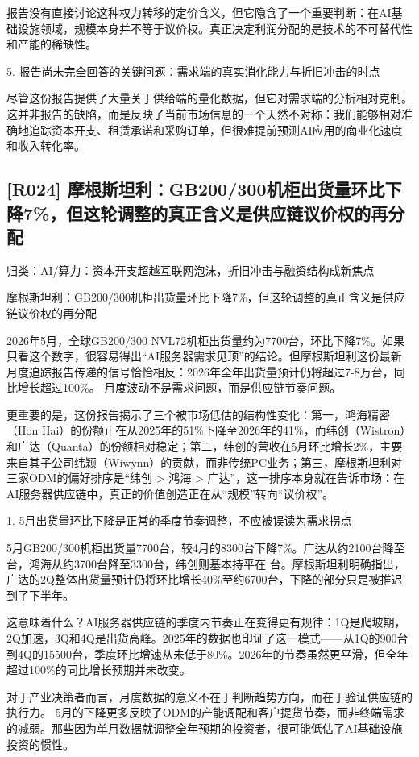 \documentclass[11pt]{ctexart}
\begin{document}
报告没有直接讨论这种权力转移的定价含义，但它隐含了一个重要判断：在AI基础设施领域，规模本身并不等于议价权。真正决定利润分配的是技术的不可替代性和产能的稀缺性。

5. 报告尚未完全回答的关键问题：需求端的真实消化能力与折旧冲击的时点

尽管这份报告提供了大量关于供给端的量化数据，但它对需求端的分析相对克制。这并非报告的缺陷，而是反映了当前市场信息的一个天然不对称：我们能够相对准确地追踪资本开支、租赁承诺和采购订单，但很难提前预测AI应用的商业化速度和收入转化率。

\subsection{[R024] 摩根斯坦利：GB200/300机柜出货量环比下降7\%，但这轮调整的真正含义是供应链议价权的再分配}
{\small\color{refgray}归类：AI/算力：资本开支超越互联网泡沫，折旧冲击与融资结构成新焦点}

摩根斯坦利：GB200/300机柜出货量环比下降7\%，但这轮调整的真正含义是供应链议价权的再分配

2026年5月，全球GB200/300 NVL72机柜出货量约为7700台，环比下降7\%。如果只看这个数字，很容易得出“AI服务器需求见顶”的结论。但摩根斯坦利这份最新月度追踪报告传递的信号恰恰相反：2026年全年出货量预计仍将超过7-8万台，同比增长超过100\%。 月度波动不是需求问题，而是供应链节奏问题。

更重要的是，这份报告揭示了三个被市场低估的结构性变化：第一，鸿海精密（Hon Hai）的份额正在从2025年的51\%下降至2026年的41\%，而纬创（Wistron）和广达（Quanta）的份额相对稳定；第二，纬创的营收在5月环比增长2\%，主要来自其子公司纬颖（Wiwynn）的贡献，而非传统PC业务；第三，摩根斯坦利对三家ODM的偏好排序是“纬创 > 鸿海 > 广达”，这一排序本身就在告诉市场：在AI服务器供应链中，真正的价值创造正在从“规模”转向“议价权”。

1. 5月出货量环比下降是正常的季度节奏调整，不应被误读为需求拐点

5月GB200/300机柜出货量7700台，较4月的8300台下降7\%。广达从约2100台降至 台，鸿海从约3700台降至3300台，纬创则基本持平在 台。摩根斯坦利明确指出，广达的2Q整体出货量预计仍将环比增长40\%至约6700台，下降的部分只是被推迟到了下半年。

这意味着什么？AI服务器供应链的季度内节奏正在变得更有规律：1Q是爬坡期，2Q加速，3Q和4Q是出货高峰。2025年的数据也印证了这一模式——从1Q的900台到4Q的15500台，季度环比增速从未低于80\%。2026年的节奏虽然更平滑，但全年超过100\%的同比增长预期并未改变。

对于产业决策者而言，月度数据的意义不在于判断趋势方向，而在于验证供应链的执行力。 5月的下降更多反映了ODM的产能调配和客户提货节奏，而非终端需求的减弱。那些因为单月数据就调整全年预期的投资者，很可能低估了AI基础设施投资的惯性。
\end{document}
